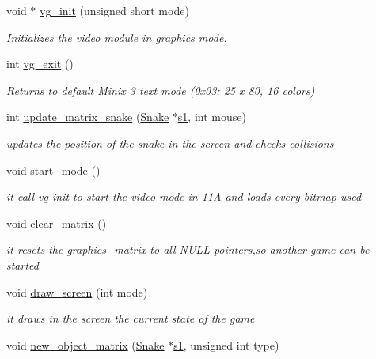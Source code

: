\begin{DoxyCompactItemize}
\item 
void $\ast$ \hyperlink{group__graphics_gacef21667c79365d57a084bed994c2189}{vg\+\_\+init} (unsigned short mode)
\begin{DoxyCompactList}\small\item\em Initializes the video module in graphics mode. \end{DoxyCompactList}\item 
int \hyperlink{group__graphics_ga9805b7e746b90143a74ad077d5d68223}{vg\+\_\+exit} ()
\begin{DoxyCompactList}\small\item\em Returns to default Minix 3 text mode (0x03\+: 25 x 80, 16 colors) \end{DoxyCompactList}\item 
int \hyperlink{group__graphics_ga7d91305a8a6ade1fc8c13c1a83e011b3}{update\+\_\+matrix\+\_\+snake} (\hyperlink{structSnake}{Snake} $\ast$\hyperlink{group__man__events_gaf79c0d77b0cca9ebf96bbbed1f88aed0}{s1}, int mouse)
\begin{DoxyCompactList}\small\item\em updates the position of the snake in the screen and checks collisions \end{DoxyCompactList}\item 
void \hyperlink{group__graphics_ga6669f4e380f03339751e723309577575}{start\+\_\+mode} ()
\begin{DoxyCompactList}\small\item\em it call vg init to start the video mode in 11A and loads every bitmap used \end{DoxyCompactList}\item 
void \hyperlink{group__graphics_ga266e075db0561b07746b8dc1d6e68ccf}{clear\+\_\+matrix} ()
\begin{DoxyCompactList}\small\item\em it resets the graphics\+\_\+matrix to all N\+U\+LL pointers,so another game can be started \end{DoxyCompactList}\item 
void \hyperlink{group__graphics_gaa559040a20c89667ba7033146b4413c5}{draw\+\_\+screen} (int mode)
\begin{DoxyCompactList}\small\item\em it draws in the screen the current state of the game \end{DoxyCompactList}\item 
void \hyperlink{group__graphics_gadcd1766a79d92c6aac52fe0c7b51454c}{new\+\_\+object\+\_\+matrix} (\hyperlink{structSnake}{Snake} $\ast$\hyperlink{group__man__events_gaf79c0d77b0cca9ebf96bbbed1f88aed0}{s1}, unsigned int type)

\end{DoxyCompactItemize}
